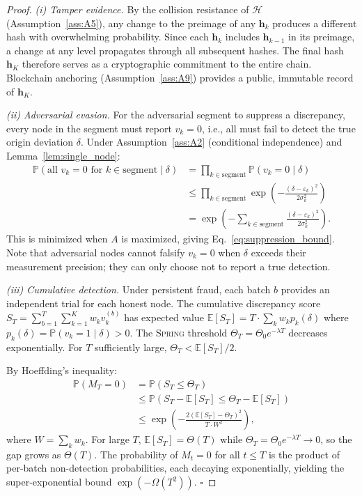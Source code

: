 \documentclass[11pt,a4paper]{article}
\theoremstyle{definition}
\theoremstyle{remark}
\newcommand{\Spring}{\textsc{Spring}}
\newcommand{\E}{\mathbb{E}}
\newcommand{\Pbb}{\mathbb{P}}
\newcommand{\hashFunc}{\mathcal{H}}
\newcommand{\hashChain}{\mathbf{h}}
\begin{document}
\begin{proof}
\textit{(i) Tamper evidence.} By the collision resistance of $\hashFunc$ (Assumption~\ref{ass:A5}), any change to the preimage of any $\hashChain_k$ produces a different hash with overwhelming probability. Since each $\hashChain_k$ includes $\hashChain_{k-1}$ in its preimage, a change at any level propagates through all subsequent hashes. The final hash $\hashChain_K$ therefore serves as a cryptographic commitment to the entire chain. Blockchain anchoring (Assumption~\ref{ass:A9}) provides a public, immutable record of $\hashChain_K$.

\textit{(ii) Adversarial evasion.} For the adversarial segment to suppress a discrepancy, every node in the segment must report $v_k = 0$, i.e., all must fail to detect the true origin deviation $\delta$. Under Assumption~\ref{ass:A2} (conditional independence) and Lemma~\ref{lem:single_node}:
\begin{align}
    \Pbb(\text{all } v_k = 0 \text{ for } k \in \text{segment} \mid \delta)
    &= \prod_{k \in \text{segment}} \Pbb(v_k = 0 \mid \delta) \\
    &\leq \prod_{k \in \text{segment}} \exp\left(-\frac{(\delta - \varepsilon_k)^2}{2\sigma_k^2}\right) \\
    &= \exp\left(-\sum_{k \in \text{segment}} \frac{(\delta - \varepsilon_k)^2}{2\sigma_k^2}\right).
\end{align}
This is minimized when $A$ is maximized, giving Eq.~\eqref{eq:suppression_bound}. Note that adversarial nodes cannot falsify $v_k = 0$ when $\delta$ exceeds their measurement precision; they can only choose not to report a true detection.

\textit{(iii) Cumulative detection.} Under persistent fraud, each batch $b$ provides an independent trial for each honest node. The cumulative discrepancy score $S_T = \sum_{b=1}^{T} \sum_{k=1}^{K} w_k v_k^{(b)}$ has expected value $\E[S_T] = T \cdot \sum_{k} w_k p_k(\delta)$ where $p_k(\delta) = \Pbb(v_k = 1 \mid \delta) > 0$. The \Spring{} threshold $\Theta_T = \Theta_0 e^{-\lambda T}$ decreases exponentially. For $T$ sufficiently large, $\Theta_T < \E[S_T]/2$.

By Hoeffding's inequality:
\begin{align}
    \Pbb(M_T = 0) &= \Pbb(S_T \leq \Theta_T) \\
    &\leq \Pbb\left(S_T - \E[S_T] \leq \Theta_T - \E[S_T]\right) \\
    &\leq \exp\left(-\frac{2(\E[S_T] - \Theta_T)^2}{T \cdot W^2}\right),
\end{align}
where $W = \sum_k w_k$. For large $T$, $\E[S_T] = \Theta(T)$ while $\Theta_T = \Theta_0 e^{-\lambda T} \to 0$, so the gap grows as $\Theta(T)$. The probability of $M_t = 0$ for all $t \leq T$ is the product of per-batch non-detection probabilities, each decaying exponentially, yielding the super-exponential bound $\exp(-\Omega(T^2))$. \hfill $\square$
\end{proof}
\end{document}
